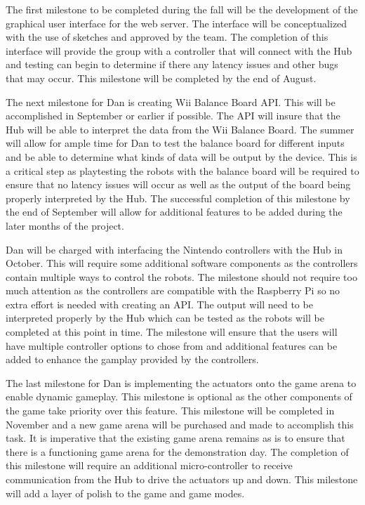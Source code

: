 \documentclass[11pt]{ieeeconf}
\begin{document}
The first milestone to be completed during the fall will be the development of the graphical user interface for the web server. The interface will be conceptualized with the use of sketches and approved by the team. The completion of this interface will provide the group with a controller that will connect with the Hub and testing can begin to determine if there any latency issues and other bugs that may occur. This milestone will be completed by the end of August.  

The next milestone for Dan is creating Wii Balance Board API. This will be accomplished in September or earlier if possible. The API will insure that the Hub will be able to interpret the data from the Wii Balance Board. The summer will allow for ample time for Dan to test the balance board for different inputs and be able to determine what kinds of data will be output by the device. This is a critical step as playtesting the robots with the balance board will be required to ensure that no latency issues will occur as well as the output of the board being properly interpreted by the Hub. The successful completion of this milestone by the end of September will allow for additional features to be added during the later months of the project.  

Dan will be charged with interfacing the Nintendo controllers with the Hub in October. This will require some additional software components as the controllers contain multiple ways to control the robots. The milestone should not require too much attention as the controllers are compatible with the Raspberry Pi so no extra effort is needed with creating an API. The output will need to be interpreted properly by the Hub which can be tested as the robots will be completed at this point in time. The milestone will ensure that the users will have multiple controller options to chose from and additional features can be added to enhance the gamplay provided by the controllers.

The last milestone for Dan is implementing the actuators onto the game arena to enable dynamic gameplay. This milestone is optional as the other components of the game take priority over this feature. This milestone will be completed in November and a new game arena will be purchased and made to accomplish this task. It is imperative that the existing game arena remains as is to ensure that there is a functioning game arena for the demonstration day. The completion of this milestone will require an additional micro-controller to receive communication from the Hub to drive the actuators up and down. This milestone will add a layer of polish to the game and game modes.
\end{document}
